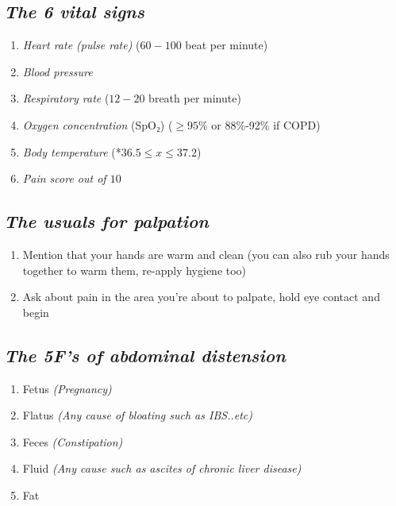 \documentclass[
  13.5pt,
  a4paper,
  DIV=11,
  numbers=noendperiod]{scrreprt}
\providecommand{\tightlist}{%
  \setlength{\itemsep}{0pt}\setlength{\parskip}{0pt}}
\begin{document}
\subsection{\texorpdfstring{\emph{The 6 vital
signs}}{The 6 vital signs}}\label{the-6-vital-signs}

\begin{enumerate}
\def\labelenumi{\arabic{enumi}.}
\tightlist
\item
  \emph{Heart rate (pulse rate)} (\(60 - 100\) beat per minute)
\item
  \emph{Blood pressure}
\item
  \emph{Respiratory rate} (\(12-20\) breath per minute)
\item
  \emph{Oxygen concentration} (SpO₂) (\(\geq 95\%\) or 88\%-92\% if
  COPD)
\item
  \emph{Body temperature} (*\(36.5\leq x \leq37.2\))
\item
  \emph{Pain score out of \(10\)}
\end{enumerate}

\subsection{\texorpdfstring{\emph{The usuals for
palpation}}{The usuals for palpation}}\label{the-usuals-for-palpation}

\begin{enumerate}
\def\labelenumi{\arabic{enumi}.}
\tightlist
\item
  Mention that your hands are warm and clean (you can also rub your
  hands together to warm them, re-apply hygiene too)
\item
  Ask about pain in the area you're about to palpate, hold eye contact
  and begin
\end{enumerate}

\subsection{\texorpdfstring{\emph{The 5F's of abdominal
distension}}{The 5F's of abdominal distension}}\label{the-5fs-of-abdominal-distension}

\begin{enumerate}
\def\labelenumi{\arabic{enumi}.}
\tightlist
\item
  Fetus \emph{(Pregnancy)}
\item
  Flatus \emph{(Any cause of bloating such as IBS..etc)}
\item
  Feces \emph{(Constipation)}
\item
  Fluid \emph{(Any cause such as ascites of chronic liver disease)}
\item
  Fat
\end{enumerate}
\end{document}
